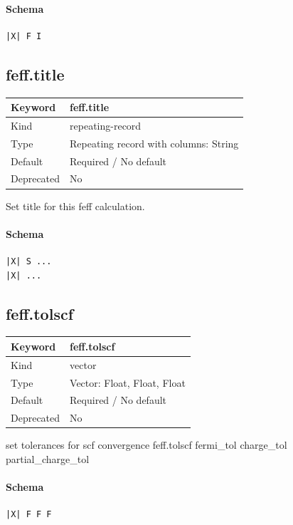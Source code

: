 \documentclass[11pt]{article}
\begin{document}
{{{{\paragraph{Schema}
\begin{Verbatim}
|X| F I
\end{Verbatim}

\subsection{feff.title}
\label{kw:feff-title}
\begin{longtable}{|p{1.5in}|p{4.5in}|}
\hline
Keyword & feff.title \\
\hline
Kind & repeating-record \\
\hline
Type & Repeating record with columns: String \\
\hline
Default & Required / No default \\
\hline
Deprecated & No \\
\hline
\end{longtable}
 Set title for this feff calculation.

\paragraph{Schema}
\begin{Verbatim}
|X| S ...
|X| ...
\end{Verbatim}

\subsection{feff.tolscf}
\label{kw:feff-tolscf}
\begin{longtable}{|p{1.5in}|p{4.5in}|}
\hline
Keyword & feff.tolscf \\
\hline
Kind & vector \\
\hline
Type & Vector: Float, Float, Float \\
\hline
Default & Required / No default \\
\hline
Deprecated & No \\
\hline
\end{longtable}
 set tolerances for scf convergence
 feff.tolscf{ fermi\_tol charge\_tol partial\_charge\_tol }

\paragraph{Schema}
\begin{Verbatim}
|X| F F F
\end{Verbatim}

}}}}
\end{document}
